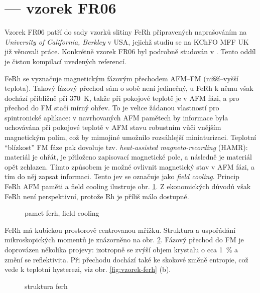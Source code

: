 \section{ --- vzorek FR06}
\label{chap:vzorek-ferh}

Vzorek FR06 patří do sady vzorků slitiny FeRh připravených naprašováním na \emph{University of California, Berkley} v USA, jejichž studiu se na KChFO MFF UK již věnovali práce.
Konkrétně vzorek FR06 byl podrobně studován v .
Tento oddíl je čistou kompilací uvedených referencí.

FeRh se vyznačuje magnetickým fázovým přechodem AFM--FM \tododash (nižší--vyšší teplota).
Takový fázový přechod sám o sobě není jedinečný, u FeRh k němu však dochází přibližně při \SI{370}{\kelvin}, takže při pokojové teplotě je v AFM fázi, a pro přechod do FM stačí mírný ohřev.
To je velice žádanou vlastností pro spintronické aplikace: v navrhovaných AFM pamětech by informace byla uchovávána při pokojové teplotě v AFM stavu robustním vůči vnějším magnetickým polím, což by mimojiné umožnilo rozsáhlejší miniaturizaci.
Teplotní ``blízkost'' FM fáze pak dovoluje tzv. \emph{heat-assisted magneto-recording} (HAMR): materiál je ohřát, je přiloženo zapisovací magnetické pole, a následně je materiál opět zchlazen.
Tímto způsobem je možné ovlivnit magnetický stav v AFM fázi, a tím do něj zapsat informaci.
Tento jev se označuje jako \emph{field cooling}.
Princip FeRh AFM paměti a field cooling ilustruje obr. \ref{fig:ferh-memory}.
Z ekonomických důvodů však FeRh není perspektivní, protože Rh je příliš málo dostupné.

\begin{figure}[htbp]
    \centering
    \caption{pamet ferh, field cooling}
    \label{fig:ferh-memory}
\end{figure}

FeRh má kubickou prostorově centrovanou mřížku.
Struktura a uspořádání mikroskopických momentů je znázorněno na obr. \ref{fig:ferh-struktura}.
Fázový přechod do FM je doprovázen několika projevy: izotropně se zvýší objem krystalu o cca \SI{1}{\percent} a změní se reflektivita.
Při přechodu dochází také ke skokové změně entropie, což vede k teplotní hysterezi, viz obr. \ref{fig:vzorek-ferh} (b).

\begin{figure}[htbp]
    \centering
    \caption{struktura ferh}
    \label{fig:ferh-struktura}
\end{figure}

